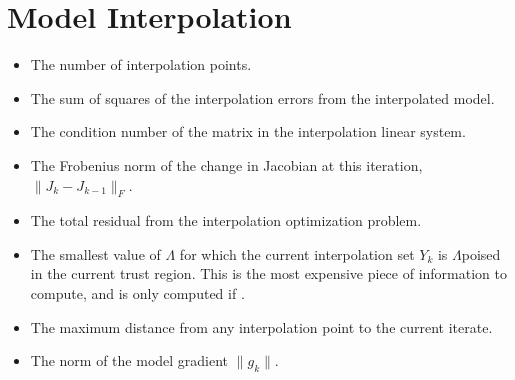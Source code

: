 \documentclass[letterpaper,10pt,english]{sphinxmanual}
\begin{document}
\section{Model Interpolation}
\label{\detokenize{diagnostic:model-interpolation}}\begin{itemize}
\item {} 
 \sphinxhyphen{} The number of interpolation points.

\item {} 
 \sphinxhyphen{} The sum of squares of the interpolation errors from the interpolated model.

\item {} 
 \sphinxhyphen{} The condition number of the matrix in the interpolation linear system.

\item {} 
 \sphinxhyphen{} The Frobenius norm of the change in Jacobian at this iteration, \(\|J_k-J_{k-1}\|_F\).

\item {} 
 \sphinxhyphen{} The total residual from the interpolation optimization problem.

\item {} 
 \sphinxhyphen{} The smallest value of \(\Lambda\) for which the current interpolation set \(Y_k\) is \(\Lambda\)\sphinxhyphen{}poised in the current trust region. This is the most expensive piece of information to compute, and is only computed if \sphinxcode{\sphinxupquote{user\_params{[}\textquotesingle{}logging.save\_poisedness\textquotesingle{} = True}}.

\item {} 
 \sphinxhyphen{} The maximum distance from any interpolation point to the current iterate.

\item {} 
 \sphinxhyphen{} The norm of the model gradient \(\|g_k\|\).

\end{itemize}
\end{document}
